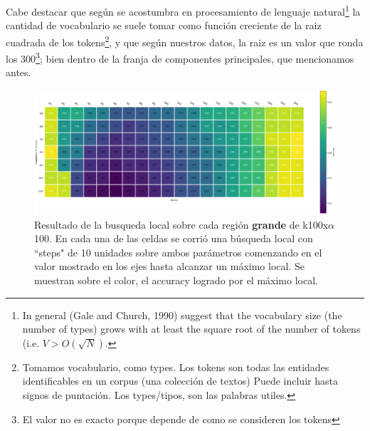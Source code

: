 Cabe destacar que según se acostumbra en procesamiento de
lenguaje\cite{LP} natural\footnote{In general (Gale and Church, 1990)
  suggest that the vocabulary size (the number of types) grows with at
  least the square root of the number of tokens (i.e.
  $V > O(\sqrt{N})$.} la cantidad de vocabulario se suele tomar como
función creciente de la raiz cuadrada de los tokens\footnote{Tomamos
  vocabulario, como types. Los tokens son todas las entidades
  identificables en un corpus (una colección de textos) Puede incluir
  hasta signos de puntación. Los types/tipos, son las palabras
  utiles.}, y que según nuestros datos, la raiz es un valor que ronda
los 300\footnote{El valor no es exacto porque depende de como se
  consideren los tokens}; bien dentro de la franja de componentes
principales, que mencionamos antes.

\begin{figure}[h]
  \includegraphics[width=1.05\textwidth]{./img/pca_big_grid.png}
  \centering
  \caption{Resultado de la busqueda local sobre cada región
    \textbf{grande} de k100x$\alpha$100. En cada una de las celdas se corrió una búsqueda local con ``steps" de 10 unidades sobre ambos parámetros comenzando en el valor mostrado en los ejes hasta alcanzar un
    máximo local. Se muestran sobre el color, el accuracy logrado por el máximo local.}
  \label{fig:pca-big}
\end{figure}


